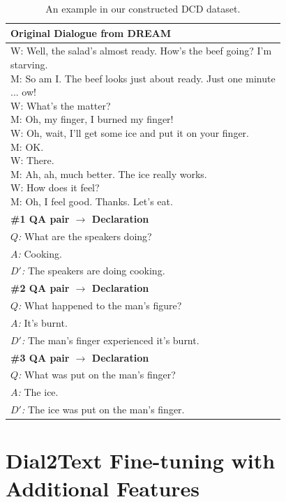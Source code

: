 \documentclass[letterpaper]{article} %
\begin{document}
\begin{table}[h]
	\centering
	\small
	\begin{tabular}{l}
		\toprule[1pt]
		\textbf{Original Dialogue from DREAM} \\
		\hline
		\makecell[l]{W: Well, the salad's almost ready. How's the beef going?  I'm\\\quad\quad starving. \\M: So am I. The beef looks just about ready. Just one minute\\\quad\quad ... ow! \\W: What's the matter? \\M: Oh, my finger, I burned my finger! \\W: Oh, wait, I'll get some ice and put it on your finger. \\M: OK. \\W: There. \\M: Ah, ah, much better. The ice really works. \\W: How does it feel? \\M: Oh, I feel good. Thanks. Let's eat.}\\
		\hline
		\textbf{\#1 QA pair $\rightarrow$ Declaration} \\
		\hline
		\textit{$Q$:} What are the speakers doing?\\
		\textit{$A$:} Cooking.\\
		\textit{$D'$:} The speakers are doing cooking.\\
		\hline
		\textbf{\#2 QA pair $\rightarrow$ Declaration} \\
		\hline
		\textit{$Q$:} What happened to the man's figure?\\
		\textit{$A$:} It's burnt.\\
		\textit{$D'$:} The man's finger experienced it's burnt.\\
		\hline	\textbf{\#3 QA pair $\rightarrow$ Declaration} \\
		\hline
		\textit{$Q$:} What was put on the man's finger?\\
		\textit{$A$:} The ice.\\
		\textit{$D'$:} The ice was put on the man's finger.\\
		\bottomrule[1pt]
	\end{tabular}
	\caption{An example in our constructed DCD dataset.}
	\label{tab:DCD}
\end{table}



\section{Dial2Text Fine-tuning with Additional Features}
\end{document}
